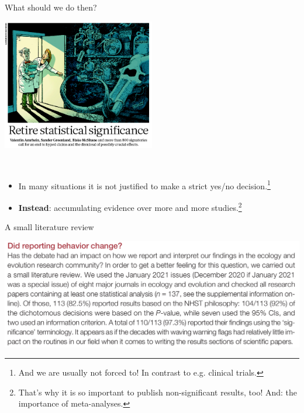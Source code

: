 \documentclass[
  10pt,
  ignorenonframetext,
]{beamer}
\providecommand{\tightlist}{%
  \setlength{\itemsep}{0pt}\setlength{\parskip}{0pt}}
\begin{document}
\begin{frame}
\begin{block}{What should we do then?}
\protect\hypertarget{what-should-we-do-then}{}
\(~\)

\centering

\includegraphics[width=0.5\textwidth,height=\textheight]{graphics/retire_significance.png}

\scriptsize

\normalsize

\(~\)

\flushleft

\begin{itemize}
\tightlist
\item
  In many situations it is not justified to make a strict yes/no
  decision.\footnote{\scriptsize And we are usually not forced to! In contrast to e.g. clinical trials.}
\end{itemize}

\vspace{2mm}

\begin{itemize}
\tightlist
\item
  \textbf{Instead}: accumulating evidence over more and more
  studies.\footnote{\scriptsize That's why it is so important to publish non-significant results, too! And: the importance of meta-analyses.}
\end{itemize}
\end{block}
\end{frame}

\begin{frame}
\begin{block}{A small literature review}
\protect\hypertarget{a-small-literature-review}{}
\(~\)

\includegraphics{graphics/reporting.png}
\end{block}
\end{frame}
\end{document}
